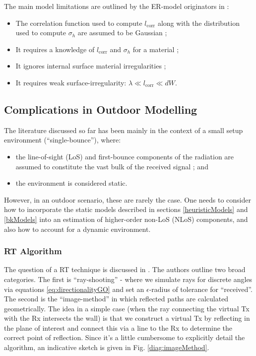 \documentclass[lettersize,journal]{IEEEtran}
\begin{document}
The main model limitations are outlined by the ER-model originators in \cite{ref:reciprocalHeur}:
\begin{itemize}
    \item The correlation function used to compute $l_{\text{corr}}$ along with the distribution used to compute $\sigma_h$ are assumed to be Gaussian ;
    \item It requires a knowledge of  $l_{\text{corr}}$ and $\sigma_h$ for a material ;
    \item It ignores internal surface material irregularities ;
    \item It requires weak surface-irregularity: $\lambda \ll l_{\text{corr}} \ll dW$.
\end{itemize}

\subsection{Complications in Outdoor Modelling}
The literature discussed so far has been mainly in the context of a small setup environment (``single-bounce''), where: \begin{itemize}
    \item the line-of-sight (LoS) and first-bounce components of the radiation are assumed to constitute the vast bulk of the received signal ; and
    \item the environment is considered static.
\end{itemize} However, in an outdoor scenario, these are rarely the case. One needs to consider how to incorporate the static models described in sections \ref{heuristicModels} and \ref{bkModels} into an estimation of higher-order non-LoS (NLoS) components, and also how to account for a dynamic environment.

\subsubsection{RT Algorithm}
The question of a RT technique is discussed in \cite{ref:RTComparison}. The authors outline two broad categories. The first is ``ray-shooting'' - where we simulate rays for discrete angles via equations \eqref{eq:directionalityGO} and set an $\epsilon$-radius of tolerance for ``received''. The second is the ``image-method'' in which reflected paths are calculated geometrically. The idea in a simple case (when the ray connecting the virtual Tx with the Rx intersects the wall) is that we construct a virtual Tx by reflecting in the plane of interest and connect this via a line to the Rx to determine the correct point of reflection. Since it's a little cumbersome to explicitly detail the algorithm, an indicative sketch is given in Fig. \ref{diag:imageMethod}.
\end{document}
